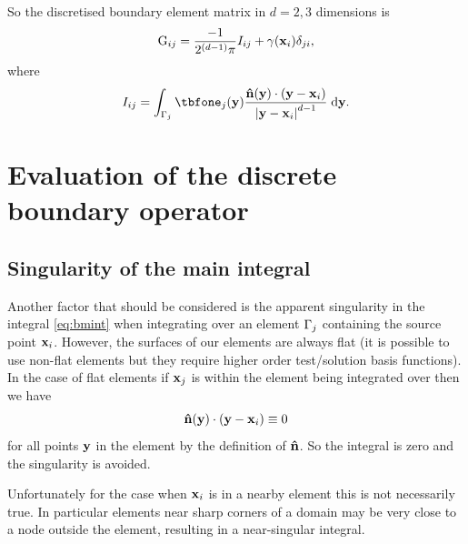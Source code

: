 \newcommand{\bminta}{I}
\newcommand{\bmint}{\bminta_{ij}}

So the discretised boundary element matrix in $d=2,3$ dimensions is
\begin{equation}
  \label{eq:19}
  \bm_{\ibasis\ibasisb} =\frac{-1}{2^{(d-1)} \pi} \bmint
    + \gamma(\xv_\ibasis)\delta_{\ibasisb\ibasis},
\end{equation}
where
\begin{equation}
  \bmint = \int_{\boundd_\ibasisb} \tbfone_{\ibasisb}(\yv) \frac{\nv(\yv) \cdot (\yv - \xv_\ibasis)}{\abs{\yv - \xv_\ibasis} ^{d-1}} \d \yv.
\label{eq:bmint}
\end{equation}

\section{Evaluation of the discrete boundary operator}
\label{sec:calc-integr-i_bm}

\subsection{Singularity of the main integral}
\label{sec:bem-singularity}

Another factor that should be considered is the apparent singularity in the integral \cref{eq:bmint} when integrating over an element ${\Gamma}_j$ containing the source point $\boldsymbol{\mathrm{x}}_{i}$.
However, the surfaces of our elements are always flat (it is possible to use non-flat elements but they require higher order test/solution basis functions).
In the case of flat elements if $\boldsymbol{\mathrm{x}}_{j}$ is within the element being integrated over then we have
\begin{equation}
  \label{eq:7}
  \boldsymbol{\mathrm{\hat{n}}}(\boldsymbol{\mathrm{y}}) \cdot (\boldsymbol{\mathrm{y}} - \boldsymbol{\mathrm{x}}_i) \equiv 0
\end{equation}
for all points $\boldsymbol{\mathrm{y}}$ in the element by the definition of $\boldsymbol{\mathrm{\hat{n}}}$.
So the integral is zero and the singularity is avoided.

Unfortunately for the case when $\boldsymbol{\mathrm{x}}_i$ is in a nearby element this is not necessarily true.
In particular elements near sharp corners of a domain may be very close to a node outside the element, resulting in a near-singular integral.



